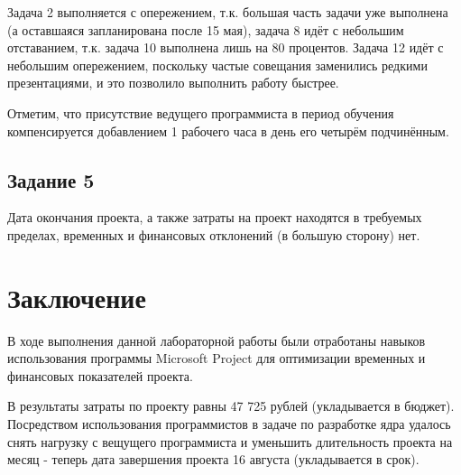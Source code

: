 Задача 2 выполняется с опережением, т.к. большая часть задачи уже выполнена (а оставшаяся запланирована после 15 мая), задача 8 идёт с небольшим отставанием, т.к. задача 10 выполнена лишь на 80 процентов. Задача 12 идёт с небольшим опережением, поскольку частые совещания заменились редкими презентациями, и это позволило выполнить работу быстрее.

Отметим, что присутствие ведущего программиста в период обучения компенсируется добавлением 1 рабочего часа в день его четырём подчинённым.

\subsection*{Задание 5}

Дата окончания проекта, а также затраты на проект находятся в требуемых пределах, временных и финансовых отклонений (в большую сторону) нет.

\section*{Заключение}

В ходе выполнения данной лабораторной работы были отработаны навыков использования программы Microsoft Project для оптимизации временных и финансовых показателей проекта.

В результаты затраты по проекту равны 47 725 рублей (укладывается в бюджет).
Посредством использования программистов в задаче по разработке ядра удалось снять нагрузку с вещущего программиста и уменьшить длительность проекта на месяц - теперь дата завершения проекта 16 августа (укладывается в срок).